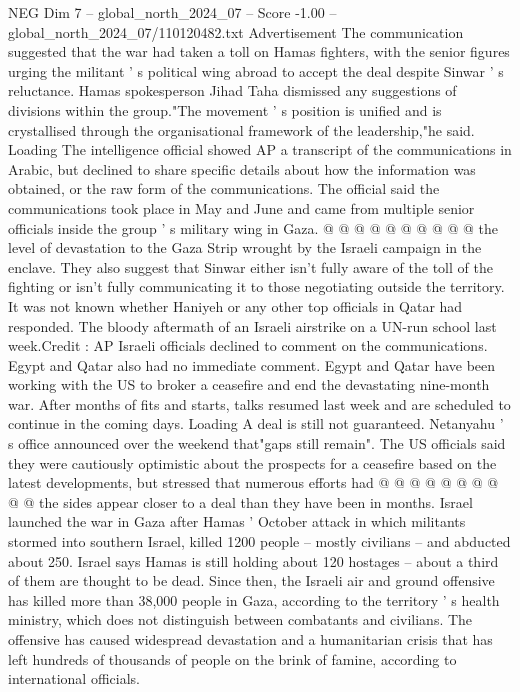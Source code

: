 \begin{textsample}{NEG Dim 7 – global\_north\_2024\_07 – Score -1.00 – global\_north\_2024\_07/110120482.txt}
Advertisement The communication suggested that the war had taken a toll on Hamas fighters, with the senior figures urging the militant ' s political wing abroad to accept the deal despite Sinwar ' s reluctance.
Hamas spokesperson Jihad Taha dismissed any suggestions of divisions within the group."The movement ' s position is unified and is crystallised through the organisational framework of the leadership,"he said.
Loading The intelligence official showed AP a transcript of the communications in Arabic, but declined to share specific details about how the information was obtained, or the raw form of the communications.
The official said the communications took place in May and June and came from multiple senior officials inside the group ' s military wing in Gaza. @ @ @ @ @ @ @ @ @ @ the level of devastation to the Gaza Strip wrought by the Israeli campaign in the enclave.
They also suggest that Sinwar either isn't fully aware of the toll of the fighting or isn't fully communicating it to those negotiating outside the territory.
It was not known whether Haniyeh or any other top officials in Qatar had responded.
The bloody aftermath of an Israeli airstrike on a UN-run school last week.Credit : AP Israeli officials declined to comment on the communications.
Egypt and Qatar also had no immediate comment.
Egypt and Qatar have been working with the US to broker a ceasefire and end the devastating nine-month war.
After months of fits and starts, talks resumed last week and are scheduled to continue in the coming days.
Loading A deal is still not guaranteed.
Netanyahu ' s office announced over the weekend that"gaps still remain".
The US officials said they were cautiously optimistic about the prospects for a ceasefire based on the latest developments, but stressed that numerous efforts had @ @ @ @ @ @ @ @ @ @ the sides appear closer to a deal than they have been in months.
Israel launched the war in Gaza after Hamas ' October attack in which militants stormed into southern Israel, killed 1200 people -- mostly civilians -- and abducted about 250.
Israel says Hamas is still holding about 120 hostages -- about a third of them are thought to be dead.
Since then, the Israeli air and ground offensive has killed more than 38,000 people in Gaza, according to the territory ' s health ministry, which does not distinguish between combatants and civilians.
The offensive has caused widespread devastation and a humanitarian crisis that has left hundreds of thousands of people on the brink of famine, according to international officials.

\end{textsample}
